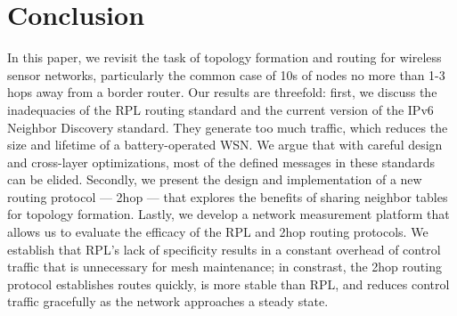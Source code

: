 \section{Conclusion}

In this paper, we revisit the task of topology formation and routing for wireless sensor networks, particularly the common case of 10s of nodes no more than 1-3 hops away from a border router.
Our results are threefold: first, we discuss the inadequacies of the RPL routing standard and the current version of the IPv6 Neighbor Discovery standard.
They generate too much traffic, which reduces the size and lifetime of a battery-operated WSN.
We argue that with careful design and cross-layer optimizations, most of the defined messages in these standards can be elided.
Secondly, we present the design and implementation of a new routing protocol --- 2hop --- that explores the benefits of sharing neighbor tables for topology formation.
Lastly, we develop a network measurement platform that allows us to evaluate the efficacy of the RPL and 2hop routing protocols.
We establish that RPL's lack of specificity results in a constant overhead of control traffic that is unnecessary for mesh maintenance; in constrast, the 2hop routing protocol establishes routes quickly, is more stable than RPL, and reduces control traffic gracefully as the network approaches a steady state.
